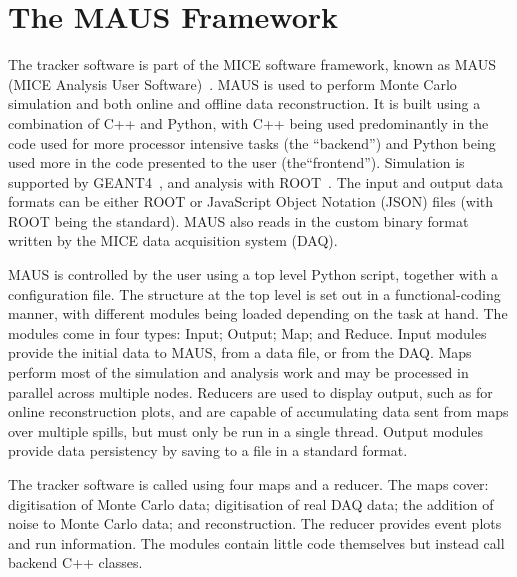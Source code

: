 \section{The MAUS Framework}
\label{sec:MAUS}
The tracker software is part of the MICE software framework, known as MAUS (MICE Analysis User Software)~\cite{MausPaper}. MAUS is used to perform Monte Carlo simulation and both online and offline data reconstruction. It is built using a combination of C++ and Python, with C++ being used predominantly in the code used for more processor intensive tasks (the ``backend'') and Python being used more in the code presented to the user (the``frontend'').  Simulation is supported by GEANT4~\cite{GEANT4}, and analysis with ROOT~\cite{ROOT}.  The input and output data formats can be either ROOT or JavaScript Object Notation (JSON) files (with ROOT being the standard). MAUS also reads in the custom binary format written by the MICE data acquisition system (DAQ). 

MAUS is controlled by the user using a top level Python script, together with a configuration file.  The structure at the top level is set out in a functional-coding manner, with different modules being loaded depending on the task at hand.  The modules come in four types: Input; Output; Map; and Reduce.  Input modules provide the initial data to MAUS, from a data file, or from the DAQ. Maps perform most of the simulation and analysis work and may be processed in parallel across multiple nodes.  Reducers are used to display output, such as for online reconstruction plots, and are capable of accumulating data sent from maps over multiple spills, but must only be run in a single thread. Output modules provide data persistency by saving to a file in a standard format.

The tracker software is called using four maps and a reducer. The maps cover: digitisation of Monte Carlo data; digitisation of real DAQ data; the addition of noise to Monte Carlo data; and reconstruction. The reducer provides event plots and run information.  The modules contain little code themselves but instead call backend C++ classes.